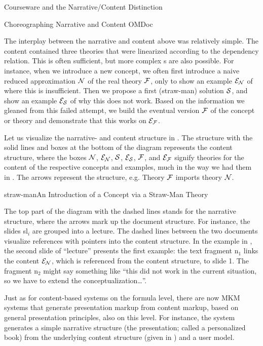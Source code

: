 \begin{tchapter}[id=courseware]{Courseware and the Narrative/Content Distinction}
\begin{tsection}[id=choreographing]{Choreographing  Narrative and Content OMDoc}

The interplay between the narrative and content {\omdoc} above was relatively
simple. The content {\omdoc} contained three theories that were linearized
according to the dependency relation. This is often sufficient, but more complex
{s} are also
possible. For instance, when we introduce a new concept, we often first introduce
a naive reduced approximation $\cal N$ of the real theory $\cal F$, only to show an example
$\cal E_N$ of where this is insufficient. Then we propose a first (straw-man)
solution $\cal S$, and show an example $\cal E_S$ of why this does not work. Based
on the information we gleaned from this failed attempt, we build the eventual
version $\cal F$ of the concept or theory and demonstrate that this works on $\cal
E_F$.

Let us visualize the narrative- and content structure in {}. The
structure with the solid lines and boxes at the bottom of the diagram represents the
content structure, where the boxes $\cal N$, $\cal E_N$, $\cal S$, $\cal E_S$,
$\cal F$, and $\cal E_F$ signify theories for the content of the respective
concepts and examples, much in the way we had them in
{}. The arrows represent the
{} structure, e.g. Theory $\cal F$ imports theory
$\cal N$.

\begin{myfig}{straw-man}{An Introduction of a Concept via a Straw-Man Theory}
  
\end{myfig}

The top part of the diagram with the dashed lines stands for the narrative structure,
where the arrows mark up the document structure. For instance, the slides {sl$_i$} are
grouped into a lecture. The dashed lines between the two documents visualize {\omdoc}
references with pointers into the content structure. In the example in
{}, the second slide of ``lecture'' presents the first example: the
text fragment {n$_1$} links the content $\cal E_N$, which is referenced from the content
structure, to slide 1. The fragment {n$_2$} might say something like ``this did not work
in the current situation, so we have to extend the conceptualization\ldots''.

Just as for content-based systems on the formula level, there are now MKM systems that
generate presentation markup from content markup, based on general presentation
principles, also on this level. For instance, the {}
system~\cite{MelBue:krma03} generates a simple narrative structure (the
presentation; called a personalized book) from the underlying content structure (given in
{\omdoc}) and a user model.
\end{tsection}


\end{tchapter}
